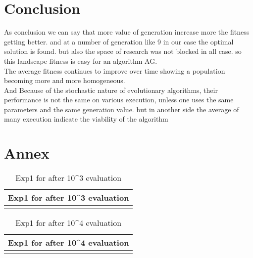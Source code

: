 \section{Conclusion}
As conclusion we can say that more value of generation increase more the fitness getting better. and at a number of generation like 9 in our case the optimal solution is found. but also the space of research was not blocked in all case. so this landscape fitness is easy for an algorithm AG.\\
The average fitness continues to improve over time showing a population becoming more and more homogeneous.\\
And Because of the stochastic nature of evolutionary algorithms, their performance is not the same on various execution, unless one uses the same parameters and the same generation value. but in another side the average of many execution indicate the viability of the algorithm























\pagebreak
\section*{Annex}

\begin{table}[H]
\centering
\caption{Exp1 for after 10\textasciicircum 3 evaluation}
\vspace{+6mm}
\label{tab:tenpower3}
\begin{tabular}{|c|l|l|c|}
\hline
\multicolumn{4}{|c|}{Exp1 for after 10\textasciicircum 3 evaluation} \\ \hline
 &  &  &  \\ \hline
\end{tabular}
\end{table}


\begin{table}[H]
\centering
\caption{Exp1 for after 10\textasciicircum 4 evaluation}
\vspace{+6mm}
\label{tab:tenpower4}
\begin{tabular}{|c|l|l|c|}
\hline
\multicolumn{4}{|c|}{Exp1 for after 10\textasciicircum 4 evaluation} \\ \hline
 &  &  &  \\ \hline
\end{tabular}
\end{table}